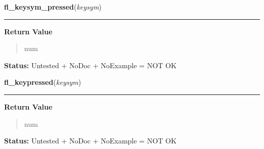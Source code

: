 \hspace{.8\funcindent}\begin{boxedminipage}{\funcwidth}

    \raggedright \textbf{fl\_keysym\_pressed}(\textit{keysym})

    \vspace{-1.5ex}

    \rule{\textwidth}{0.5\fboxrule}
\setlength{\parskip}{2ex}
\setlength{\parskip}{1ex}
      \textbf{Return Value}
    \vspace{-1ex}

      \begin{quote}
      num

      \end{quote}

\textbf{Status:} Untested + NoDoc + NoExample = NOT OK



    \end{boxedminipage}

    \label{xformslib:library:fl_keysym_pressed}

    \vspace{0.5ex}

\hspace{.8\funcindent}\begin{boxedminipage}{\funcwidth}

    \raggedright \textbf{fl\_keypressed}(\textit{keysym})

    \vspace{-1.5ex}

    \rule{\textwidth}{0.5\fboxrule}
\setlength{\parskip}{2ex}
\setlength{\parskip}{1ex}
      \textbf{Return Value}
    \vspace{-1ex}

      \begin{quote}
      num

      \end{quote}

\textbf{Status:} Untested + NoDoc + NoExample = NOT OK



    \end{boxedminipage}

    \label{xformslib:library:fl_set_defaults}

